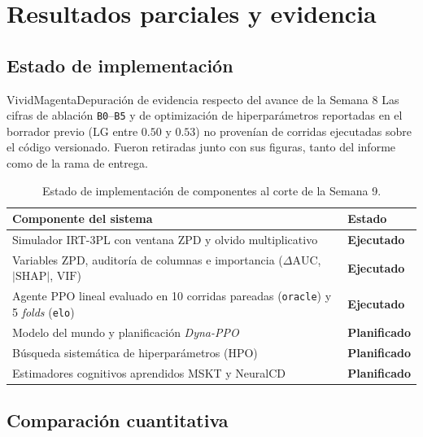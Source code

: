 \documentclass[10.5pt,a4paper]{article}
\newcommand{\code}[1]{\texttt{\color{InkDark}#1}}
\begin{document}
\section{Resultados parciales y evidencia}

\subsection{Estado de implementación}

\begin{calloutbox}[TintRose]{VividMagenta}{Depuración de evidencia respecto del avance de la Semana 8}
Las cifras de ablación \code{B0}--\code{B5} y de optimización de hiperparámetros reportadas en el borrador previo ($\mathrm{LG}$ entre $0.50$ y $0.53$) no provenían de corridas ejecutadas sobre el código versionado. Fueron retiradas junto con sus figuras, tanto del informe como de la rama de entrega.
\end{calloutbox}

\begin{table}[H]
  \centering
  \caption{Estado de implementación de componentes al corte de la Semana 9.}
  \begin{tabularx}{\textwidth}{X >{\leavevmode\bfseries}p{3.6cm}}
    \toprule
    \rowcolor{UNIGranate} \textbf{\color{white}Componente del sistema} & \textbf{\color{white}Estado} \\
    \midrule
    Simulador IRT-3PL con ventana ZPD y olvido multiplicativo & \color{EmeraldGreen}Ejecutado \\
    \rowcolor{RowTintBlue} Variables ZPD, auditoría de columnas e importancia ($\Delta\mathrm{AUC}$, $|\mathrm{SHAP}|$, $\mathrm{VIF}$) & \color{EmeraldGreen}Ejecutado \\
    Agente PPO lineal evaluado en 10 corridas pareadas (\code{oracle}) y 5 \textit{folds} (\code{elo}) & \color{EmeraldGreen}Ejecutado \\
    \rowcolor{RowTintBlue} Modelo del mundo y planificación \textit{Dyna-PPO} & \color{MutedSlate}Planificado \\
    Búsqueda sistemática de hiperparámetros (HPO) & \color{MutedSlate}Planificado \\
    \rowcolor{RowTintBlue} Estimadores cognitivos aprendidos MSKT y NeuralCD & \color{MutedSlate}Planificado \\
    \bottomrule
  \end{tabularx}
\end{table}

\subsection{Comparación cuantitativa}
\end{document}
